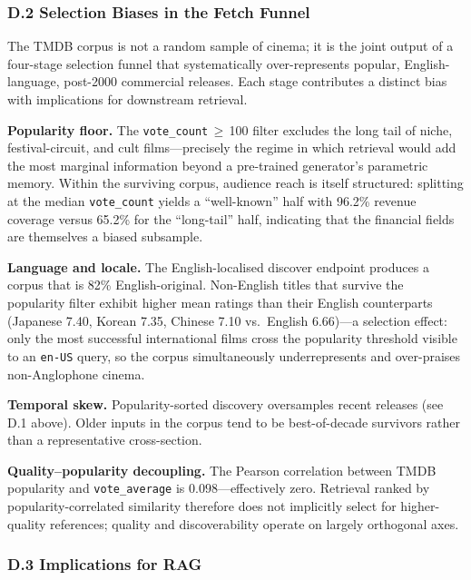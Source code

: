 \documentclass[10pt,twocolumn]{article}
\begin{document}
\subsubsection*{D.2 Selection Biases in the Fetch Funnel}

The TMDB corpus is not a random sample of cinema; it is the
joint output of a four-stage selection funnel that systematically
over-represents popular, English-language, post-2000 commercial
releases. Each stage contributes a distinct bias with
implications for downstream retrieval.

\textbf{Popularity floor.} The \texttt{vote\_count}\,$\geq$\,100
filter excludes the long tail of niche, festival-circuit, and
cult films---precisely the regime in which retrieval would add
the most marginal information beyond a pre-trained generator's
parametric memory. Within the surviving corpus, audience reach
is itself structured: splitting at the median \texttt{vote\_count}
yields a ``well-known'' half with 96.2\% revenue coverage versus
65.2\% for the ``long-tail'' half, indicating that the financial
fields are themselves a biased subsample.

\textbf{Language and locale.} The English-localised discover
endpoint produces a corpus that is 82\% English-original.
Non-English titles that survive the popularity filter exhibit
higher mean ratings than their English counterparts
(Japanese 7.40, Korean 7.35, Chinese 7.10 vs.\ English
6.66)---a selection effect: only the most successful
international films cross the popularity threshold visible to
an \texttt{en-US} query, so the corpus simultaneously
underrepresents and over-praises non-Anglophone cinema.

\textbf{Temporal skew.} Popularity-sorted discovery oversamples
recent releases (see D.1 above). Older inputs in the corpus
tend to be best-of-decade survivors rather than a representative
cross-section.

\textbf{Quality--popularity decoupling.} The Pearson correlation
between TMDB popularity and \texttt{vote\_average} is
$0.098$---effectively zero. Retrieval ranked by
popularity-correlated similarity therefore does not implicitly
select for higher-quality references; quality and discoverability
operate on largely orthogonal axes.

\subsubsection*{D.3 Implications for RAG}
\end{document}
